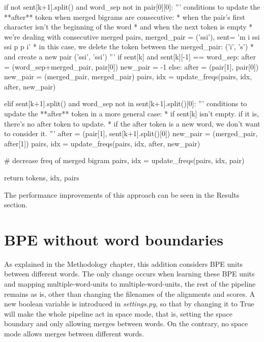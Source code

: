 \begin{python}
      if not sent[k+1].split() and word_sep not in pair[0][0]:
        '''
        conditions to update the **after** token when merged bigrams are consecutive:
        * when the pair's first character isn't the beginning of the word
        * and when the next token is empty
        * we're dealing with consecutive merged pairs, merged_pair = ('ssi'), sent= 'm i ssi ssi p p i'
            * in this case, we delete the token between the merged_pair: ('i', 's')
            * and create a new pair ('ssi', 'ssi')
        '''
        if sent[k] and sent[k][-1] == word_sep:
            after = (word_sep+merged_pair, pair[0])
            new_pair = -1
        else:
            after = (pair[1], pair[0])
            new_pair = (merged_pair, merged_pair)
            pairs, idx = update_freqs(pairs, idx, after, new_pair)

      elif sent[k+1].split() and word_sep not in sent[k+1].split()[0]:
        '''
        conditions to update the **after** token in a more general case:
        * if sent[k] isn't empty. if it is, there's no after token to update.
        * if the after token is a new word, we don't want to consider it.
        '''
        after = (pair[1], sent[k+1].split()[0])
        new_pair = (merged_pair, after[1])
        pairs, idx = update_freqs(pairs, idx, after, new_pair)

      # decrease freq of merged bigram
      pairs, idx = update_freqs(pairs, idx, pair)

  return tokens, idx, pairs
\end{python}

The performance improvements of this approach can be seen in the Results section.

\section{BPE without word boundaries}

As explained in the Methodology chapter, this addition considers BPE units between different words. The only change occurs when learning these BPE units and mapping multiple-word-units to multiple-word-units, the rest of the pipeline remains as is, other than changing the filenames of the alignments and scores. A new boolean variable is introduced in \emph{settings.py}, so that by changing it to True will make the whole pipeline act in space mode, that is, setting the space boundary and only allowing merges between words. On the contrary, no space mode allows merges between different words.

